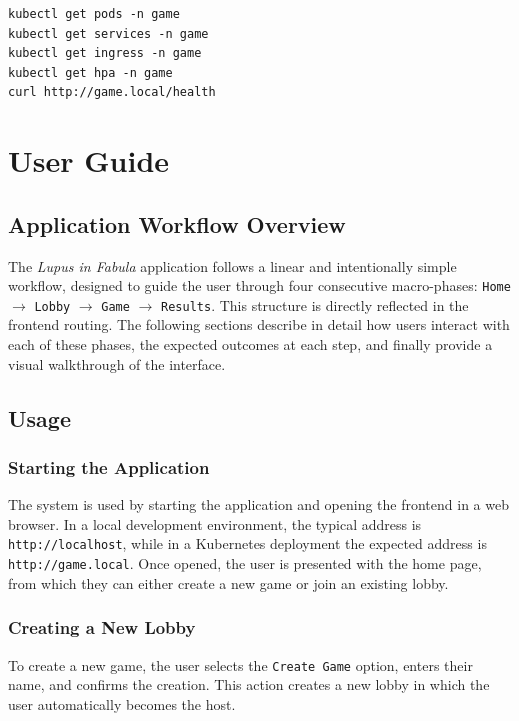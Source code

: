 \documentclass{scrartcl}
\begin{document}
\begin{verbatim}
kubectl get pods -n game
kubectl get services -n game
kubectl get ingress -n game
kubectl get hpa -n game
curl http://game.local/health
\end{verbatim}

\section{User Guide}\label{user-guide}

\subsection{Application Workflow Overview}

The \emph{Lupus in Fabula} application follows a linear and intentionally simple workflow, designed to guide the user through four consecutive macro-phases: \texttt{Home} $\rightarrow$ \texttt{Lobby} $\rightarrow$ \texttt{Game} $\rightarrow$ \texttt{Results}. This structure is directly reflected in the frontend routing. The following sections describe in detail how users interact with each of these phases, the expected outcomes at each step, and finally provide a visual walkthrough of the interface.

\subsection{Usage}
\label{sec:usage}

\subsubsection{Starting the Application}

The system is used by starting the application and opening the frontend in a web browser. In a local development environment, the typical address is \texttt{http://localhost}, while in a Kubernetes deployment the expected address is \texttt{http://game.local}. Once opened, the user is presented with the home page, from which they can either create a new game or join an existing lobby.

\subsubsection{Creating a New Lobby}

To create a new game, the user selects the \texttt{Create Game} option, enters their name, and confirms the creation. This action creates a new lobby in which the user automatically becomes the host.
\end{document}
